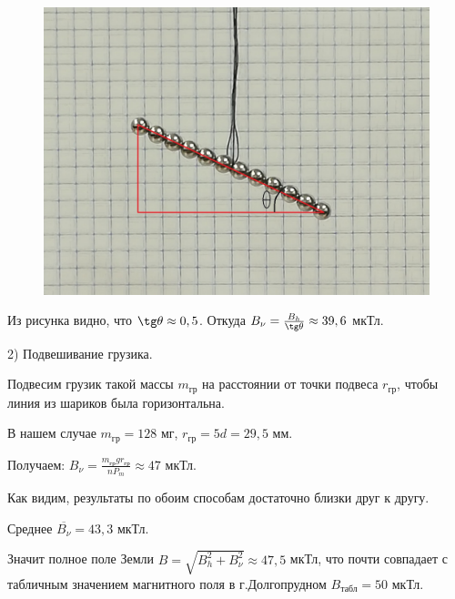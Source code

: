 \documentclass[a4paper,12pt]{article} %
\begin{document}
\begin{figure}[h!]
	\centering
	\includegraphics[scale=0.5]{Pictures/angleMes.jpg}
\end{figure}

Из рисунка видно, что $\tg\theta \approx 0,5$. Откуда $B_{\nu} = \frac{B_h}{\tg\theta} \approx 39,6$ мкТл.

\vspace{10mm}
2) Подвешивание грузика.

Подвесим грузик такой массы $m_{\text{гр}}$ на расстоянии от точки подвеса $r_{\text{гр}}$, чтобы линия из шариков была горизонтальна.

В нашем случае $m_{\text{гр}} = 128$ мг, $r_{\text{гр}} = 5d = 29,5$ мм.

Получаем: $B_{\nu} = \frac{m_{\text{гр}}gr_{\text{гр}}}{nP_m} \approx 47$ мкТл.

\vspace{12mm}

Как видим, результаты по обоим способам достаточно близки друг к другу.

Среднее $\overline{B_{\nu}} = 43,3$ мкТл.

Значит полное поле Земли $B = \sqrt{B_{h}^2 + B_{\nu}^2} \approx 47,5$ мкТл, что почти совпадает с табличным значением магнитного поля в г.Долгопрудном $B_{\text{табл}} = 50$ мкТл.
\end{document}
